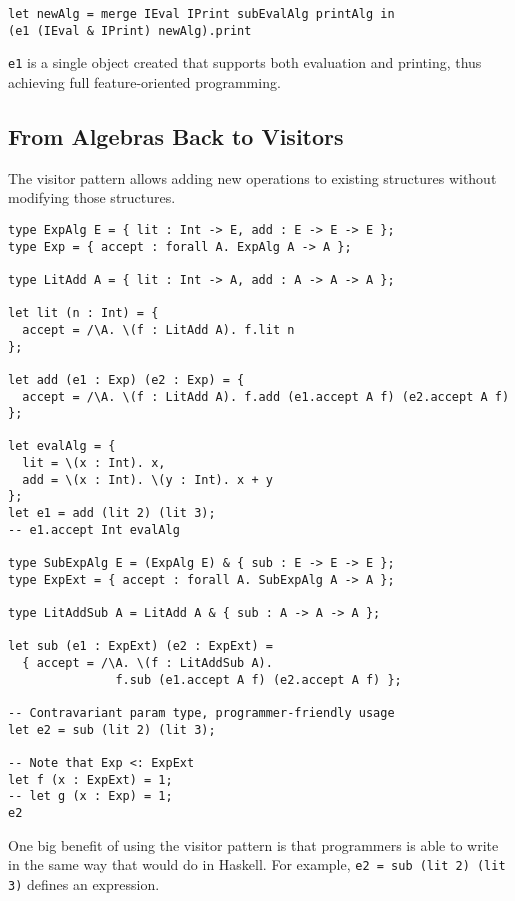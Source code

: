 \begin{verbatim}
let newAlg = merge IEval IPrint subEvalAlg printAlg in
(e1 (IEval & IPrint) newAlg).print
\end{verbatim}

\lstinline{e1} is a single object created that supports both evaluation and
printing, thus achieving full feature-oriented programming.

\subsection{From Algebras Back to Visitors}

The visitor pattern allows adding new operations to existing structures without
modifying those structures.

\begin{verbatim}
type ExpAlg E = { lit : Int -> E, add : E -> E -> E };
type Exp = { accept : forall A. ExpAlg A -> A };

type LitAdd A = { lit : Int -> A, add : A -> A -> A };

let lit (n : Int) = {
  accept = /\A. \(f : LitAdd A). f.lit n
};

let add (e1 : Exp) (e2 : Exp) = {
  accept = /\A. \(f : LitAdd A). f.add (e1.accept A f) (e2.accept A f)
};

let evalAlg = {
  lit = \(x : Int). x,
  add = \(x : Int). \(y : Int). x + y
};
let e1 = add (lit 2) (lit 3);
-- e1.accept Int evalAlg

type SubExpAlg E = (ExpAlg E) & { sub : E -> E -> E };
type ExpExt = { accept : forall A. SubExpAlg A -> A };

type LitAddSub A = LitAdd A & { sub : A -> A -> A };

let sub (e1 : ExpExt) (e2 : ExpExt) =
  { accept = /\A. \(f : LitAddSub A).
               f.sub (e1.accept A f) (e2.accept A f) };

-- Contravariant param type, programmer-friendly usage
let e2 = sub (lit 2) (lit 3);

-- Note that Exp <: ExpExt
let f (x : ExpExt) = 1;
-- let g (x : Exp) = 1;
e2
\end{verbatim}

One big benefit of using the visitor pattern is that programmers is able to
write in the same way that would do in Haskell. For example,
\lstinline{e2 = sub (lit 2) (lit 3)}
defines an expression.

